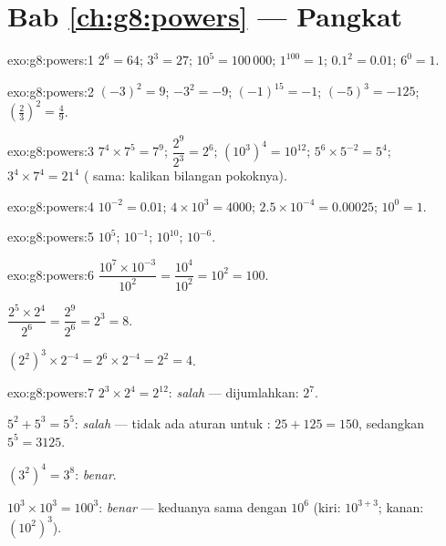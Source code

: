 \section*{Bab \ref{ch:g8:powers} --- Pangkat}

\begin{solution}{exo:g8:powers:1}
$2^6 = 64$; \quad $3^3 = 27$; \quad $10^5 = 100\,000$; \quad
$1^{100} = 1$; \quad $0.1^2 = 0.01$; \quad $6^0 = 1$.
\end{solution}

\begin{solution}{exo:g8:powers:2}
$(-3)^2 = 9$; \quad $-3^2 = -9$; \quad $(-1)^{15} = -1$; \quad
$(-5)^3 = -125$; \quad $\left(\frac23\right)^2 = \frac49$.
\end{solution}

\begin{solution}{exo:g8:powers:3}
$7^4 \times 7^5 = 7^9$; \quad
$\dfrac{2^9}{2^3} = 2^6$; \quad
$\left(10^3\right)^4 = 10^{12}$; \quad
$5^6 \times 5^{-2} = 5^4$; \quad
$3^4 \times 7^4 = 21^4$ ( sama: kalikan bilangan pokoknya).
\end{solution}

\begin{solution}{exo:g8:powers:4}
$10^{-2} = 0.01$; \quad
$4 \times 10^3 = 4000$; \quad
$2.5 \times 10^{-4} = 0.00025$; \quad
$10^0 = 1$.
\end{solution}

\begin{solution}{exo:g8:powers:5}
$10^5$; \quad $10^{-1}$; \quad $10^{10}$; \quad $10^{-6}$.
\end{solution}

\begin{solution}{exo:g8:powers:6}
$\dfrac{10^7 \times 10^{-3}}{10^2} = \dfrac{10^4}{10^2} = 10^2 =
100$.

$\dfrac{2^5 \times 2^4}{2^6} = \dfrac{2^9}{2^6} = 2^3 = 8$.

$\left(2^2\right)^3 \times 2^{-4} = 2^6 \times 2^{-4} = 2^2 = 4$.
\end{solution}

\begin{solution}{exo:g8:powers:7}
$2^3 \times 2^4 = 2^{12}$: \emph{salah} ---  dijumlahkan:
$2^7$.

$5^2 + 5^3 = 5^5$: \emph{salah} --- tidak ada aturan untuk :
$25 + 125 = 150$, sedangkan $5^5 = 3125$.

$(3^2)^4 = 3^8$: \emph{benar}.

$10^3 \times 10^3 = 100^3$: \emph{benar} --- keduanya sama dengan $10^6$
(kiri: $10^{3+3}$; kanan: $(10^2)^3$).
\end{solution}

